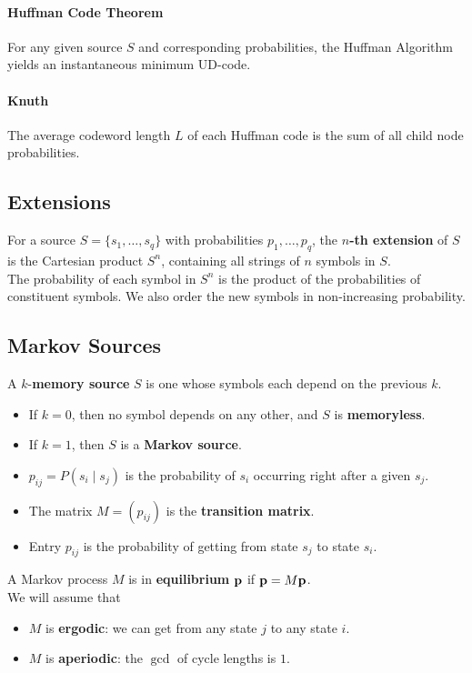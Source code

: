 \paragraph{Huffman Code Theorem}
For any given source \(S\) and corresponding probabilities, the Huffman Algorithm yields an instantaneous minimum UD-code.

\paragraph{Knuth}
The average codeword length \(L\) of each Huffman code is the sum of all child node probabilities.

\subsection{Extensions}
For a source \(S = \{s_1, \dots, s_q\}\) with probabilities \(p_1, \dots, p_q\), the \textbf{\(n\)-th extension} of \(S\) is the Cartesian product \(S^n\), containing all strings of \(n\) symbols in \(S\). \\

The probability of each symbol in \(S^n\) is the product of the probabilities of constituent symbols. We also order the new symbols in non-increasing probability.

\subsection{Markov Sources}
A \(k\)-\textbf{memory source} \(S\) is one whose symbols each depend on the previous \(k\).
\begin{itemize}
    \item If \(k = 0\), then no symbol depends on any other, and \(S\) is \textbf{memoryless}.
    \item If \(k = 1\), then \(S\) is a \textbf{Markov source}.
    \item \(p_{ij} = P(s_i \mid s_j)\) is the probability of \(s_i\) occurring right after a given \(s_j\).
    \item The matrix \(M = (p_{ij})\) is the \textbf{transition matrix}.
    \item Entry \(p_{ij}\) is the probability of getting from state \(s_j\) to state \(s_i\).
\end{itemize}

A Markov process \(M\) is in \textbf{equilibrium} \(\mathbf{p}\) if \(\mathbf{p} = M\mathbf{p}\). \\

We will assume that
\begin{itemize}
    \item \(M\) is \textbf{ergodic}: we can get from any state \(j\) to any state \(
          i\).
    \item \(M\) is \textbf{aperiodic}: the \(\gcd\) of cycle lengths is \(1\).
\end{itemize}

